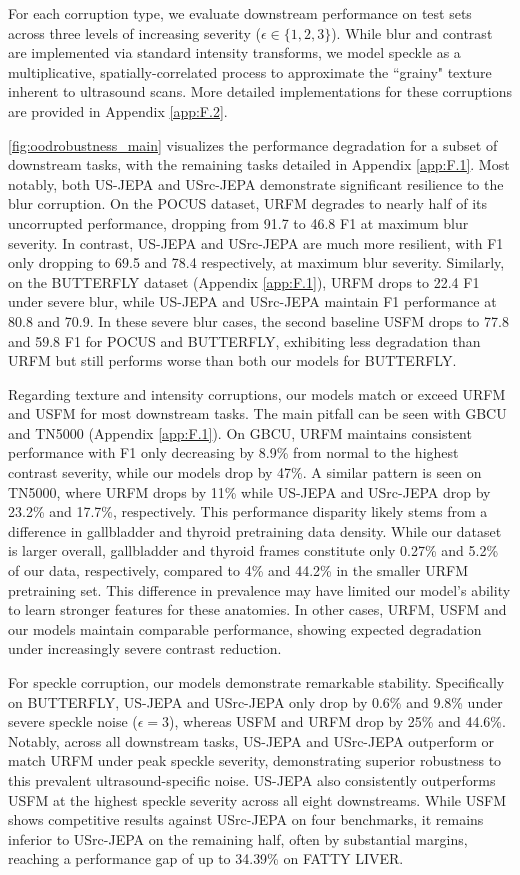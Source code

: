 \documentclass{article}
\theoremstyle{plain}
\theoremstyle{definition}
\theoremstyle{remark}
\begin{document}
For each corruption type, we evaluate downstream performance on test sets across three levels of increasing severity ($\epsilon \in \{1, 2, 3\}$). While blur and contrast are implemented via standard intensity transforms, we model speckle as a multiplicative, spatially-correlated process to approximate the ``grainy" texture inherent to ultrasound scans. More detailed implementations for these corruptions are provided in Appendix \cref{app:F.2}.

\cref{fig:oodrobustness_main} visualizes the performance degradation for a subset of downstream tasks, with the remaining tasks detailed in Appendix \cref{app:F.1}. Most notably, both US-JEPA and USrc-JEPA demonstrate significant resilience to the blur corruption. On the POCUS dataset, URFM degrades to nearly half of its uncorrupted performance, dropping from 91.7 to 46.8 F1 at maximum blur severity. In contrast, US-JEPA and USrc-JEPA are much more resilient, with F1 only dropping to 69.5 and 78.4 respectively, at maximum blur severity. Similarly, on the BUTTERFLY dataset (Appendix \cref{app:F.1}), URFM drops to 22.4 F1 under severe blur, while US-JEPA and USrc-JEPA maintain F1 performance at 80.8 and 70.9. In these severe blur cases, the second baseline USFM drops to 77.8 and 59.8 F1 for POCUS and BUTTERFLY, exhibiting less degradation than URFM but still performs worse than both our models for BUTTERFLY.

Regarding texture and intensity corruptions, our models match or exceed URFM and USFM for most downstream tasks. The main pitfall can be seen with GBCU and TN5000 (Appendix \cref{app:F.1}). On GBCU, URFM maintains consistent performance with F1 only decreasing by 8.9\% from normal to the highest contrast severity, while our models drop by 47\%. A similar pattern is seen on TN5000, where URFM drops by 11\% while US-JEPA and USrc-JEPA drop by 23.2\% and 17.7\%, respectively. This performance disparity likely stems from a difference in gallbladder and thyroid pretraining data density. While our dataset is larger overall, gallbladder and thyroid frames constitute only 0.27\% and 5.2\% of our data, respectively, compared to 4\% and 44.2\% in the smaller URFM pretraining set. This difference in prevalence may have limited our model's ability to learn stronger features for these anatomies. In other cases, URFM, USFM and our models maintain comparable performance, showing expected degradation under increasingly severe contrast reduction.

For speckle corruption, our models demonstrate remarkable stability. Specifically on BUTTERFLY, US-JEPA and USrc-JEPA only drop by 0.6\% and 9.8\% under severe speckle noise ($\epsilon=3$), whereas USFM and URFM drop by 25\% and 44.6\%. Notably, across all downstream tasks, US-JEPA and USrc-JEPA outperform or match URFM under peak speckle severity, demonstrating superior robustness to this prevalent ultrasound-specific noise. US-JEPA also consistently outperforms USFM at the highest speckle severity across all eight downstreams. While USFM shows competitive results against USrc-JEPA on four benchmarks, it remains inferior to USrc-JEPA on the remaining half, often by substantial margins, reaching a performance gap of up to 34.39\% on FATTY LIVER.
\end{document}
